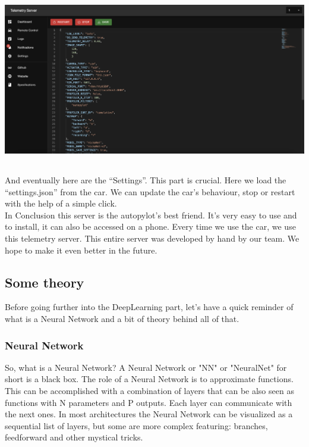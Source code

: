 \documentclass[12pt]{article}
\begin{document}
\centerline{\includegraphics[height=7.5cm]{../../docs/settings.png}}
And eventually here are the “Settings”. This part is crucial. Here we load the “settings.json” from the car. We can update the car’s behaviour, stop or restart with the help of a simple click.\\

In Conclusion this server is the autopylot’s best friend. It’s very easy to use and to install, it can also be accessed on a phone. Every time we use the car, we use this telemetry server. This entire server was developed by hand by our team. We hope to make it even better in the future.

\newpage

\subsection{Some theory}
Before going further into the DeepLearning part, let's have a quick reminder of what is a Neural Network and a bit of theory behind all of that. \\

\subsubsection{Neural Network}
So, what is a Neural Network? 
A Neural Network or "NN" or "NeuralNet" for short is a black box. The role of a Neural Network is to approximate functions. This can be accomplished with a combination of layers that can be also seen as functions with N parameters and P outputs. Each layer can communicate with the next ones. In most architectures the Neural Network can be visualized as a sequential list of layers, but some are more complex featuring: branches, feedforward and other mystical tricks. \\
\end{document}
